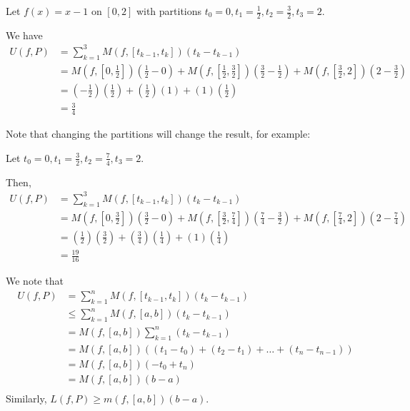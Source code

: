 \documentclass{article}
\begin{document}
\begin{example}
  Let $f(x) = x-1$ on $[0, 2]$ with partitions $t_0 = 0, t_1 = \frac{1}{2}, t_2 = \frac{3}{2}, t_3 = 2$.

  We have
  \begin{align*}
    U(f, P) &= \sum_{k=1}^3 M(f, [t_{k-1}, t_k])(t_k - t_{k-1})\\
    &=M\left(f, \left[0, \frac{1}{2}\right]\right)\left(\frac{1}{2}-0\right) + M\left(f, \left[\frac{1}{2}, \frac{3}{2}\right]\right)\left(\frac{3}{2} - \frac{1}{2}\right) + M\left(f, \left[\frac{3}{2}, 2\right]\right)\left(2 - \frac{3}{2}\right)\\
    &= \left(-\frac{1}{2}\right)\left(\frac{1}{2}\right) + \left(\frac{1}{2}\right)(1) + (1)\left(\frac{1}{2}\right)\\
    &= \frac{3}{4}
  \end{align*}

  Note that changing the partitions will change the result, for example:

  Let $t_0 = 0, t_1 = \frac{3}{2}, t_2 = \frac{7}{4}, t_3 = 2$.

  Then,
  \begin{align*}
    U(f, P) &= \sum_{k=1}^3 M(f, [t_{k-1}, t_k])(t_k - t_{k-1})\\
    &=M\left(f, \left[0, \frac{3}{2}\right]\right)\left(\frac{3}{2}-0\right) + M\left(f, \left[\frac{3}{2}, \frac{7}{4}\right]\right)\left(\frac{7}{4} - \frac{3}{2}\right) + M\left(f, \left[\frac{7}{4}, 2\right]\right)\left(2 - \frac{7}{4}\right)\\
    &= \left(\frac{1}{2}\right)\left(\frac{3}{2}\right) + \left(\frac{3}{4}\right)\left(\frac{1}{4}\right) + (1)\left(\frac{1}{4}\right)\\
    &= \frac{19}{16}
  \end{align*}
\end{example}
\begin{corollary}
  We note that
  \begin{align*}
    U(f, P) &= \sum_{k=1}^n M(f, [t_{k-1}, t_k])(t_k - t_{k-1}) \tag{Note that the second term is always greater than 0}\\
    &\leq \sum_{k=1}^n M(f, [a, b])(t_k - t_{k-1}) \tag{if $A \subseteq B$, then $\sup A \leq \sup B$}\\
    &= M(f, [a, b])\sum_{k=1}^n (t_k - t_{k-1})\\
    &= M(f, [a, b])\left((t_1 - t_0) + (t_2 - t_1) + \dots + (t_n - t_{n-1})\right)\\
    &= M(f, [a, b])(-t_0 + t_n)\\
    &= M(f, [a, b])(b-a)\\
  \end{align*}
  Similarly, $L(f, P) \geq m(f, [a, b])(b-a)$.
\end{corollary}
\end{document}
